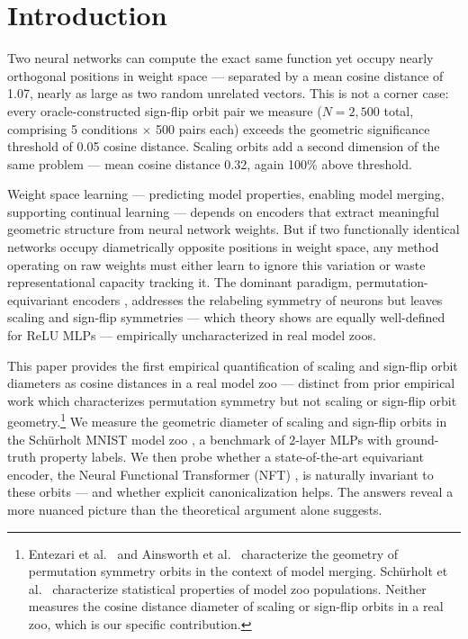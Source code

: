 \section{Introduction}

Two neural networks can compute the exact same function yet occupy nearly orthogonal positions in weight space --- separated by a mean cosine distance of 1.07, nearly as large as two random unrelated vectors. This is not a corner case: every oracle-constructed sign-flip orbit pair we measure ($N=2{,}500$ total, comprising 5 conditions $\times$ 500 pairs each) exceeds the geometric significance threshold of 0.05 cosine distance. Scaling orbits add a second dimension of the same problem --- mean cosine distance 0.32, again 100\% above threshold.

Weight space learning --- predicting model properties, enabling model merging, supporting continual learning --- depends on encoders that extract meaningful geometric structure from neural network weights. But if two functionally identical networks occupy diametrically opposite positions in weight space, any method operating on raw weights must either learn to ignore this variation or waste representational capacity tracking it. The dominant paradigm, permutation-equivariant encoders \citep{Zhou2023, Navon2023}, addresses the relabeling symmetry of neurons but leaves scaling and sign-flip symmetries --- which theory shows are equally well-defined for ReLU MLPs \citep{Navon2023EquivariantArchitectures} --- empirically uncharacterized in real model zoos.

This paper provides the first empirical quantification of scaling and sign-flip orbit diameters as cosine distances in a real model zoo --- distinct from prior empirical work \citep{Entezari2022, Ainsworth2022} which characterizes permutation symmetry but not scaling or sign-flip orbit geometry.\footnote{Entezari et al.\ \citep{Entezari2022PermutationSymmetry} and Ainsworth et al.\ \citep{Ainsworth2022GitReBasin} characterize the geometry of permutation symmetry orbits in the context of model merging. Schürholt et al.\ \citep{Schurholt2022ModelZoos} characterize statistical properties of model zoo populations. Neither measures the cosine distance diameter of scaling or sign-flip orbits in a real zoo, which is our specific contribution.} We measure the geometric diameter of scaling and sign-flip orbits in the Schürholt MNIST model zoo \citep{Schurholt2022ModelZoos}, a benchmark of 2-layer MLPs with ground-truth property labels. We then probe whether a state-of-the-art equivariant encoder, the Neural Functional Transformer (NFT) \citep{Zhou2023NeuralFunctionalNetworks}, is naturally invariant to these orbits --- and whether explicit canonicalization helps. The answers reveal a more nuanced picture than the theoretical argument alone suggests.

